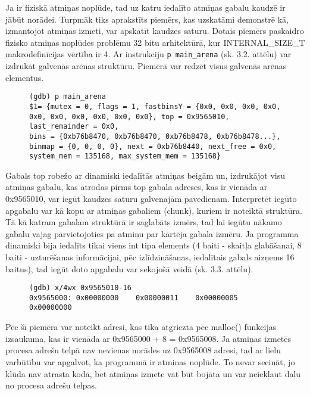 Ja ir fiziskā atmiņas noplūde, tad uz katru iedalīto atmiņas gabalu kaudzē ir jābūt norādei.
Turpmāk tiks aprakstīts piemērs, kas uzskatāmi demonstrē kā, izmantojot atmiņas izmeti, var apskatīt kaudzes saturu.
Dotais piemērs paskaidro fizisko atmiņas noplūdes problēmu 32 bitu arhitektūrā, kur INTERNAL\_SIZE\_T makrodefinīcijas vērtība ir 4.
Ar instrukciju \texttt{p main\_arena} (sk. 3.2. attēlu) var izdrukāt galvenās arēnas struktūru. 
Piemērā var redzēt visus galvenās arēnas elementus. 
\begin{figure}[h]
\fontsize{11}{12}
\begin{lstlisting}
(gdb) p main_arena
$1= {mutex = 0, flags = 1, fastbinsY = {0x0, 0x0, 0x0, 0x0, 0x0, 0x0, 0x0, 0x0, 0x0, 0x0}, top = 0x9565010, last_remainder = 0x0,
bins = {0xb76b8470, 0xb76b8470, 0xb76b8478, 0xb76b8478...},
binmap = {0, 0, 0, 0}, next = 0xb76b8440, next_free = 0x0, system_mem = 135168, max_system_mem = 135168}
\end{lstlisting}
\caption{\textbf{\fontsize{11}{12}\selectfont {Galvenās arēnas struktūras izdrukāšana, Intel x86, 32 bitu arhitektūrā}}}
\end{figure}
Gabals top robežo ar dinamiski iedalītās atmiņas beigām un, izdrukājot visu atmiņas gabalu, kas atrodas pirms top gabala adreses, kas ir vienāda ar 0x9565010, var iegūt kaudzes saturu galvenajām pavedienam.
Interpretēt iegūto apgabalu var kā kopu ar atmiņas gabaliem (chunk), kuriem ir noteiktā struktūra.
Tā kā katram gabalam struktūrā ir saglabāts  izmērs, tad lai iegūtu nākamo gabalu vajag pārvietojoties pa atmiņu par kārtēja gabala izmēru.
Ja programma dinamiski bija iedalīts tikai viens int tipa elements (4 baiti - skaitļa glabāšanai, 8 baiti - uzturēšanas informācijai, pēc izlīdzināšanas, iedalītais gabals aizņems 16 baitus), tad iegūt doto apgabalu var sekojošā veidā (sk. 3.3. attēlu).
\begin{figure}[h]
\fontsize{11}{12}
\begin{lstlisting}
(gdb) x/4wx 0x9565010-16
0x9565000: 0x00000000    0x00000011    0x00000005    0x00000000
\end{lstlisting}
\caption{\textbf{\fontsize{11}{12}\selectfont {Galvenās arēnas struktūras izdrukāšana, Intel x86, 32 bitu arhitektūrā}}}
\end{figure}

Pēc šī piemēra var noteikt adresi, kas tika atgriezta pēc malloc() funkcijas izsaukuma, kas ir vienāda ar 0x9565000 + 8 = 0x9565008.
Ja atmiņas izmetēs procesa adrešu telpā nav nevienas norādes uz 0x9565008 adresi, tad ar lielu varbūtību var apgalvot, ka programmā ir atmiņas noplūde.
To nevar secināt, jo kļūda nav atrasta kodā, bet atmiņas izmete vat būt bojāta un var neiekļaut daļu no procesa adrešu telpas.



